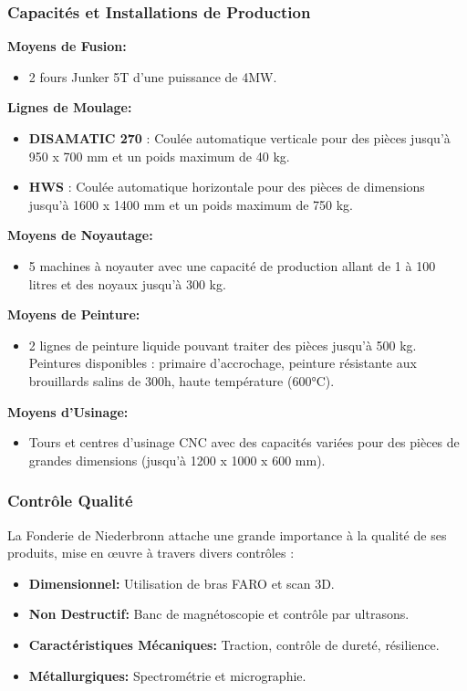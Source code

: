 \documentclass[12pt]{article}
\begin{document}
\subsubsection*{Capacités et Installations de Production}
\textbf{Moyens de Fusion:}
\begin{itemize}
    \item 2 fours Junker 5T d'une puissance de 4MW.
\end{itemize}

\textbf{Lignes de Moulage:}
\begin{itemize}
    \item \textbf{DISAMATIC 270} : Coulée automatique verticale pour des pièces jusqu'à 950 x 700 mm et un poids maximum de 40 kg.
    \item \textbf{HWS} : Coulée automatique horizontale pour des pièces de dimensions jusqu'à 1600 x 1400 mm et un poids maximum de 750 kg.
\end{itemize}

\textbf{Moyens de Noyautage:}
\begin{itemize}
    \item 5 machines à noyauter avec une capacité de production allant de 1 à 100 litres et des noyaux jusqu'à 300 kg.
\end{itemize}

\textbf{Moyens de Peinture:}
\begin{itemize}
    \item 2 lignes de peinture liquide pouvant traiter des pièces jusqu'à 500 kg. Peintures disponibles : primaire d'accrochage, peinture résistante aux brouillards salins de 300h, haute température (600°C).
\end{itemize}

\textbf{Moyens d'Usinage:}
\begin{itemize}
    \item Tours et centres d'usinage CNC avec des capacités variées pour des pièces de grandes dimensions (jusqu'à 1200 x 1000 x 600 mm).
\end{itemize}

\subsubsection*{Contrôle Qualité}
La Fonderie de Niederbronn attache une grande importance à la qualité de ses produits, mise en œuvre à travers divers contrôles :
\begin{itemize}
    \item \textbf{Dimensionnel:} Utilisation de bras FARO et scan 3D.
    \item \textbf{Non Destructif:} Banc de magnétoscopie et contrôle par ultrasons.
    \item \textbf{Caractéristiques Mécaniques:} Traction, contrôle de dureté, résilience.
    \item \textbf{Métallurgiques:} Spectrométrie et micrographie.
\end{itemize}
\end{document}
